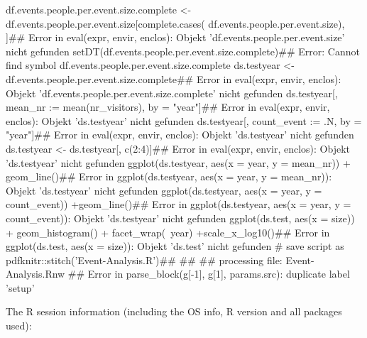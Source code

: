 \documentclass{article}\usepackage[]{graphicx}\usepackage[]{color}
\begin{document}
df.events.people.per.event.size.complete <- df.events.people.per.event.size[complete.cases(
  df.events.people.per.event.size), ]## Error in eval(expr, envir, enclos): Objekt 'df.events.people.per.event.size' nicht gefunden
setDT(df.events.people.per.event.size.complete)## Error: Cannot find symbol df.events.people.per.event.size.complete
ds.testyear <- df.events.people.per.event.size.complete## Error in eval(expr, envir, enclos): Objekt 'df.events.people.per.event.size.complete' nicht gefunden
ds.testyear[, mean_nr := mean(nr_visitors), by = "year"]## Error in eval(expr, envir, enclos): Objekt 'ds.testyear' nicht gefunden
ds.testyear[, count_event := .N, by = "year"]## Error in eval(expr, envir, enclos): Objekt 'ds.testyear' nicht gefunden
ds.testyear <- ds.testyear[, c(2:4)]## Error in eval(expr, envir, enclos): Objekt 'ds.testyear' nicht gefunden
ggplot(ds.testyear, aes(x = year, y = mean_nr)) + geom_line()## Error in ggplot(ds.testyear, aes(x = year, y = mean_nr)): Objekt 'ds.testyear' nicht gefunden
ggplot(ds.testyear, aes(x = year, y = count_event)) +geom_line()## Error in ggplot(ds.testyear, aes(x = year, y = count_event)): Objekt 'ds.testyear' nicht gefunden
ggplot(ds.test, aes(x = size)) + geom_histogram() + facet_wrap(~year) +scale_x_log10()## Error in ggplot(ds.test, aes(x = size)): Objekt 'ds.test' nicht gefunden
# save script as pdfknitr::stitch('Event-Analysis.R')## 
## 
## processing file: Event-Analysis.Rnw
## Error in parse_block(g[-1], g[1], params.src): duplicate label 'setup'


The R session information (including the OS info, R version and all
packages used):
\end{document}
